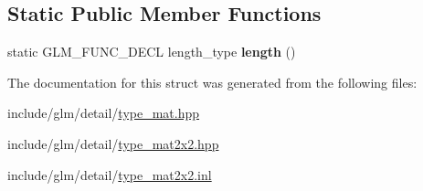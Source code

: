 \subsection*{Static Public Member Functions}
\begin{DoxyCompactItemize}
\item 
\mbox{\label{structglm_1_1tmat2x2_ace332602fd29965128159cc5cae051c3}} 
static G\+L\+M\+\_\+\+F\+U\+N\+C\+\_\+\+D\+E\+CL length\+\_\+type {\bfseries length} ()
\end{DoxyCompactItemize}


The documentation for this struct was generated from the following files\+:\begin{DoxyCompactItemize}
\item 
include/glm/detail/\hyperlink{type__mat_8hpp}{type\+\_\+mat.\+hpp}\item 
include/glm/detail/\hyperlink{type__mat2x2_8hpp}{type\+\_\+mat2x2.\+hpp}\item 
include/glm/detail/\hyperlink{type__mat2x2_8inl}{type\+\_\+mat2x2.\+inl}\end{DoxyCompactItemize}

